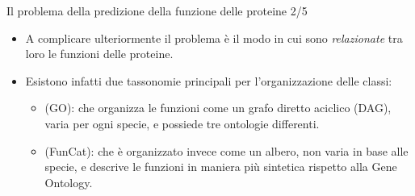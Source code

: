 \documentclass{beamer}
\begin{document}
\begin{tframe}{\small Il problema della predizione della funzione delle proteine 2/5}
\begin{itemize}
\item A complicare ulteriormente il problema è il modo in cui sono \emph{relazionate} tra loro le funzioni delle proteine.
\item Esistono infatti due tassonomie principali per l'organizzazione delle classi:
\begin{itemize}

\item {} (GO):  che organizza le funzioni come un grafo diretto aciclico (DAG), varia per ogni specie, e possiede tre ontologie differenti.
\item {} (FunCat): che è organizzato invece come un albero, non varia in base alle specie, e descrive le funzioni in maniera più sintetica rispetto alla Gene Ontology.
\end{itemize}

\end{itemize}  

\end{tframe}
\end{document}
